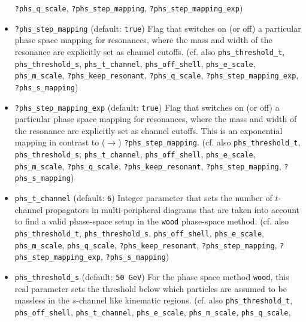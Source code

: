 \documentclass[12pt]{book}
\newcommand{\ttt}[1]{\texttt{#1}}
\begin{document}
\begin{itemize}
\ttt{?phs\_q\_scale}, \ttt{?phs\_step\_mapping}, 
\ttt{?phs\_step\_mapping\_exp}) 
\item
\ttt{?phs\_step\_mapping} \qquad (default: \ttt{true}) \newline
Flag that switches on (or off) a particular phase space mapping for
resonances, where the mass and width of the resonance are explicitly
set as channel cutoffs. (cf. also 
\ttt{phs\_threshold\_t}, \ttt{phs\_threshold\_s},
\ttt{phs\_t\_channel}, \ttt{phs\_off\_shell},  \ttt{phs\_e\_scale},
\newline \ttt{phs\_m\_scale}, \ttt{?phs\_keep\_resonant},
\ttt{?phs\_q\_scale}, \ttt{?phs\_step\_mapping\_exp}, 
\newline \ttt{?phs\_s\_mapping}) 
\item
\ttt{?phs\_step\_mapping\_exp} \qquad (default: \ttt{true}) \newline 
Flag that switches on (or off) a particular phase space mapping for
resonances, where the mass and width of the resonance are explicitly
set as channel cutoffs. This is an exponential mapping in contrast to
($\to$) \ttt{?phs\_step\_mapping}. (cf. also 
\ttt{phs\_threshold\_t}, \ttt{phs\_threshold\_s},
\ttt{phs\_t\_channel}, \ttt{phs\_off\_shell},  \ttt{phs\_e\_scale},
\ttt{phs\_m\_scale}, \newline \ttt{?phs\_q\_scale},
\ttt{?phs\_keep\_resonant}, \ttt{?phs\_step\_mapping},
\ttt{?phs\_s\_mapping})  
\item
\ttt{phs\_t\_channel} \qquad (default: \ttt{6}) \newline
Integer parameter that sets the number of $t$-channel propagators in
multi-peripheral diagrams that are taken into account to  
find a valid phase-space setup in the \ttt{wood} phase-space method. 
(cf. also \ttt{phs\_threshold\_t},
\ttt{phs\_threshold\_s}, \ttt{phs\_off\_shell}, \ttt{phs\_e\_scale}, 
\ttt{phs\_m\_scale}, \ttt{phs\_q\_scale},
\ttt{?phs\_keep\_resonant}, \ttt{?phs\_step\_mapping},
\newline \ttt{?phs\_step\_mapping\_exp}, 
\ttt{?phs\_s\_mapping}) 
\item
\ttt{phs\_threshold\_s} \qquad (default: \ttt{50 GeV}) \newline
For the phase space method \ttt{wood}, this real parameter sets the
threshold below which particles are assumed to be massless in the
$s$-channel like kinematic regions. (cf. also \ttt{phs\_threshold\_t},
\ttt{phs\_off\_shell}, \ttt{phs\_t\_channel}, \ttt{phs\_e\_scale}, 
\ttt{phs\_m\_scale}, \newline \ttt{phs\_q\_scale},

\end{itemize}
\end{document}
